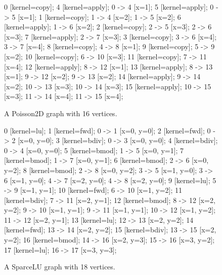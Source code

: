 \documentclass[11pt, oneside]{article}   	%
\begin{document}
\begin{figure}
 {
	0	 [kernel=copy];
	4	 [kernel=apply];
	0 -> 4	 [x=1];
	5	 [kernel=apply];
	0 -> 5	 [x=1];
	1	 [kernel=copy];
	1 -> 4	 [x=2];
	1 -> 5	 [x=2];
	6	 [kernel=apply];
	1 -> 6	 [x=2];
	2	 [kernel=copy];
	2 -> 5	 [x=3];
	2 -> 6	 [x=3];
	7	 [kernel=apply];
	2 -> 7	 [x=3];
	3	 [kernel=copy];
	3 -> 6	 [x=4];
	3 -> 7	 [x=4];
	8	 [kernel=copy];
	4 -> 8	 [x=1];
	9	 [kernel=copy];
	5 -> 9	 [x=2];
	10	 [kernel=copy];
	6 -> 10	 [x=3];
	11	 [kernel=copy];
	7 -> 11	 [x=4];
	12	 [kernel=apply];
	8 -> 12	 [x=1];
	13	 [kernel=apply];
	8 -> 13	 [x=1];
	9 -> 12	 [x=2];
	9 -> 13	 [x=2];
	14	 [kernel=apply];
	9 -> 14	 [x=2];
	10 -> 13	 [x=3];
	10 -> 14	 [x=3];
	15	 [kernel=apply];
	10 -> 15	 [x=3];
	11 -> 14	 [x=4];
	11 -> 15	 [x=4];
}
\centering
\caption{A Poisson2D graph with 16 vertices.}
\end{figure}

\begin{figure}
 {
	0	 [kernel=lu];
	1	 [kernel=fwd];
	0 -> 1	 [x=0,
		y=0];
	2	 [kernel=fwd];
	0 -> 2	 [x=0,
		y=0];
	3	 [kernel=bdiv];
	0 -> 3	 [x=0,
		y=0];
	4	 [kernel=bdiv];
	0 -> 4	 [x=0,
		y=0];
	5	 [kernel=bmod];
	1 -> 5	 [x=0,
		y=1];
	7	 [kernel=bmod];
	1 -> 7	 [x=0,
		y=1];
	6	 [kernel=bmod];
	2 -> 6	 [x=0,
		y=2];
	8	 [kernel=bmod];
	2 -> 8	 [x=0,
		y=2];
	3 -> 5	 [x=1,
		y=0];
	3 -> 6	 [x=1,
		y=0];
	4 -> 7	 [x=2,
		y=0];
	4 -> 8	 [x=2,
		y=0];
	9	 [kernel=lu];
	5 -> 9	 [x=1,
		y=1];
	10	 [kernel=fwd];
	6 -> 10	 [x=1,
		y=2];
	11	 [kernel=bdiv];
	7 -> 11	 [x=2,
		y=1];
	12	 [kernel=bmod];
	8 -> 12	 [x=2,
		y=2];
	9 -> 10	 [x=1,
		y=1];
	9 -> 11	 [x=1,
		y=1];
	10 -> 12	 [x=1,
		y=2];
	11 -> 12	 [x=2,
		y=1];
	13	 [kernel=lu];
	12 -> 13	 [x=2,
		y=2];
	14	 [kernel=fwd];
	13 -> 14	 [x=2,
		y=2];
	15	 [kernel=bdiv];
	13 -> 15	 [x=2,
		y=2];
	16	 [kernel=bmod];
	14 -> 16	 [x=2,
		y=3];
	15 -> 16	 [x=3,
		y=2];
	17	 [kernel=lu];
	16 -> 17	 [x=3,
		y=3];
}
\centering
\caption{A SparceLU graph with 18 vertices.}
\end{figure}
\end{document}
